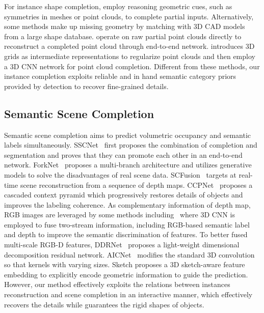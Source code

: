 \documentclass[final]{cvpr}
\begin{document}
For instance shape completion, \cite{pauly2008discovering,speciale2016symmetry,thrun2005shape} employ reasoning geometric cues, such as symmetries in meshes or point clouds, to complete partial inputs. Alternatively, some methods \cite{nan2012search,shao2012interactive,kim2012acquiring} make up missing geometry by matching with 3D CAD models from a large shape database. \cite{yuan2018pcn,tchapmi2019topnet,huang2020pf,wang2020cascaded,wen2020point} operate on raw partial point clouds directly to reconstruct a completed point cloud through end-to-end network. \cite{xie2020grnet} introduces 3D grids as intermediate representations to regularize point clouds and then employ a 3D CNN network for point cloud completion.
Different from these methods, our instance completion exploits reliable and in hand semantic category priors provided by detection to recover fine-grained details.


\subsection{Semantic Scene Completion}
\vspace{-0.2cm}
Semantic scene completion aims to predict volumetric occupancy and semantic labels simultaneously. SSCNet~\cite{song2017semantic-sscnet} first proposes the combination of completion and segmentation and proves that they can promote each other in an end-to-end network. ForkNet~\cite{wang2019forknet} proposes a multi-branch architecture and utilizes generative models to solve the disadvantages of real scene data. SCFusion~\cite{wu2020scfusion} targets at real-time scene reconstruction from a sequence of depth maps. CCPNet~\cite{zhang2019cascaded-ccpnet} proposes a cascaded context pyramid which progressively restores details of objects and improves the labeling coherence. As complementary information of depth map, RGB images are leveraged by some methods including~\cite{guedes2018semantic,garbade2019two,liu2018see} where 3D CNN is employed to fuse two-stream information, including RGB-based semantic label and depth to improve the semantic discrimination of features. To better fused multi-scale RGB-D features, DDRNet~\cite{li2019rgbd-ddrnet} proposes a light-weight dimensional decomposition residual network. AICNet~\cite{Li2020aicnet} modifies the standard 3D convolution so that kernels with varying sizes. Sketch \cite{Chen_2020_SketchAwareSSC} proposes a 3D sketch-aware feature embedding to explicitly encode geometric information to guide the prediction.
However, our method effectively exploits the relations between instances reconstruction and scene completion in an interactive manner, which effectively recovers the details while guarantees the rigid shapes of objects.
\vspace{-0.2cm}
\end{document}
